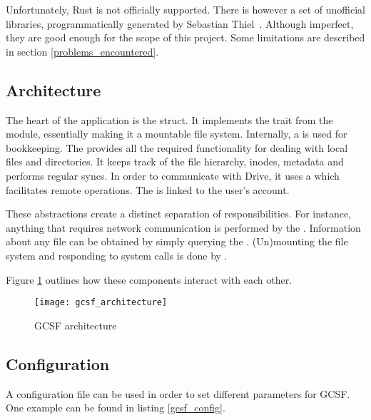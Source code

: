 Unfortunately, Rust is not officially supported. There is however a set of unofficial libraries, programmatically generated by Sebastian Thiel~\cite{google_apis_rs,sebastian_thiel}. Although imperfect, they are good enough for the scope of this project. Some limitations are described in section \ref{problems_encountered}.

\subsection{Architecture}

The heart of the application is the  struct. It implements the  trait from the  module, essentially making it a mountable file system. Internally, a  is used for bookkeeping. The  provides all the required functionality for dealing with local files and directories. It keeps track of the file hierarchy, inodes, metadata and performs regular syncs. In order to communicate with Drive, it uses a  which facilitates remote operations. The  is linked to the user's account.

These abstractions create a distinct separation of responsibilities. For instance, anything that requires network communication is performed by the . Information about any file can be obtained by simply querying the . (Un)mounting the file system and responding to system calls is done by .

Figure \ref{fig:gcsf_architecture} outlines how these components interact with each other.

\begin{figure}[bpt]
\caption{GCSF architecture}
\label{fig:gcsf_architecture}
\centering
\texttt{[image: gcsf\_architecture]}
\end{figure}

\subsection{Configuration}

A configuration file can be used in order to set different parameters for GCSF. One example can be found in listing \ref{gcsf_config}. 


